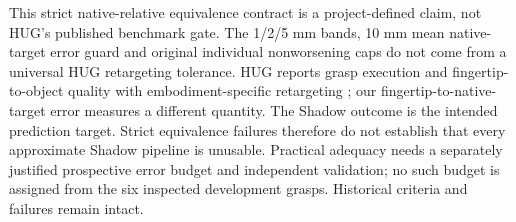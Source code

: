 This strict native-relative equivalence contract is a project-defined claim,
not HUG's published benchmark gate. The 1/2/5 mm bands, 10 mm mean
native-target error guard and original individual nonworsening caps do not
come from a universal HUG retargeting tolerance. HUG reports grasp execution
and fingertip-to-object quality with embodiment-specific retargeting
\cite{hug}; our fingertip-to-native-target error measures a different quantity.
The Shadow outcome is the intended prediction target. Strict equivalence
failures therefore do not establish that every approximate Shadow pipeline is
unusable. Practical adequacy needs a separately justified prospective error
budget and independent validation; no such budget is assigned from the six
inspected development grasps. Historical criteria and failures remain intact.
